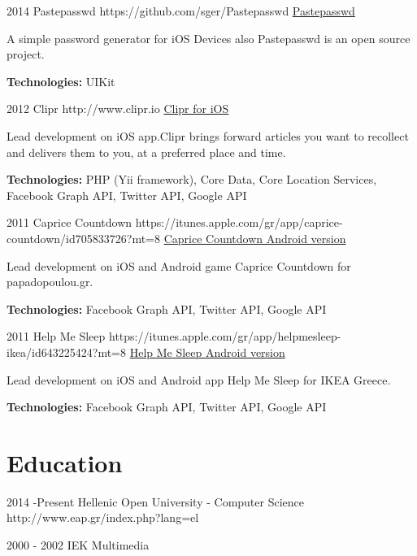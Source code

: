 \documentclass[10pt]{article}
\begin{document}
\job
{2014}{}
{Pastepasswd}
{https://github.com/sger/Pastepasswd}
{\href{http://www.spirosgerokostas.com/paste-passwd/}{Pastepasswd}}
{A simple password generator for iOS Devices also Pastepasswd is an open source project.
\\
\rule{0mm}{5mm}\textbf{Technologies:} UIKit}

\job
{2012}{}
{Clipr}
{http://www.clipr.io}
{\href{https://itunes.apple.com/us/app/clipr/id582636684?ls=1&mt=8&2}{Clipr for iOS}}
{Lead development on iOS app.Clipr brings forward articles you want to recollect and delivers them to you, at a preferred place and time.
\\
\rule{0mm}{5mm}\textbf{Technologies:} PHP (Yii framework), Core Data, Core Location Services, Facebook Graph API, Twitter API, Google API}

\job
{2011}{}
{Caprice Countdown}
{https://itunes.apple.com/gr/app/caprice-countdown/id705833726?mt=8}
{\href{https://play.google.com/store/apps/details?id=air.CapriceIceAndroid}{Caprice Countdown Android version}}
{Lead development on iOS and Android game Caprice Countdown for papadopoulou.gr.
\\
\rule{0mm}{5mm}\textbf{Technologies:} Facebook Graph API, Twitter API, Google API}

\job
{2011}{}
{Help Me Sleep}
{https://itunes.apple.com/gr/app/helpmesleep-ikea/id643225424?mt=8}
{\href{https://play.google.com/store/apps/details?id=air.HelpMeSleep}{Help Me Sleep Android version}}
{Lead development on iOS and Android app Help Me Sleep for IKEA Greece.
\\
\rule{0mm}{5mm}\textbf{Technologies:} Facebook Graph API, Twitter API, Google API}


\section{Education}

\education
{2014 -}{Present}
{Hellenic Open University - Computer Science}
{http://www.eap.gr/index.php?lang=el}


\education
{2000 - 2002}{}
{IEK Multimedia}
{}

\end{document}
